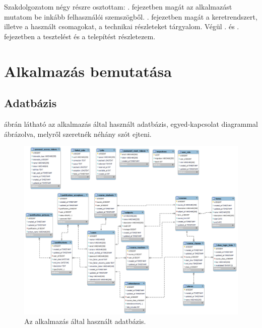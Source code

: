 \documentclass[
]{thesis-ekf}
\theoremstyle{definition}
\theoremstyle{remark}
\begin{document}
Szakdolgozatom négy részre osztottam: . fejezetben magát az alkalmazást mutatom be inkább felhasználói szemszögből. . fejezetben magát a keretrendszert, illetve a használt csomagokat, a technikai részleteket tárgyalom. Végül . és . fejezetben a tesztelést és a telepítést részletezem.

\chapter{Alkalmazás bemutatása}
\label{appDescription}
\section{Adatbázis}

 ábrán látható az alkalmazás által használt adatbázis, egyed-kapcsolat diagrammal ábrázolva, melyről szeretnék néhány szót ejteni.

\begin{figure}[ht!]
	\centering
	\includegraphics[width=15cm]{../pictures/db.png}
	\caption{Az alkalmazás által használt adatbázis.}
	\label{database}
\end{figure}
\end{document}
